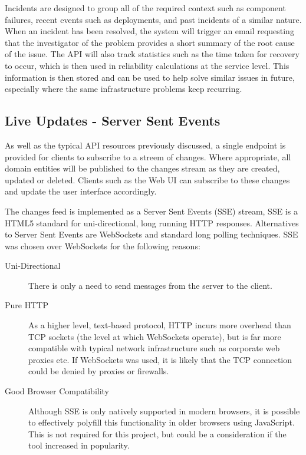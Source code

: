 \documentclass{cshonours}
\begin{document}
Incidents are designed to group all of the required context such as component failures, recent events such as deployments, and past incidents of a similar nature. When an incident has been resolved, the system will trigger an email requesting that the investigator of the problem provides a short summary of the root cause of the issue. The API will also track statistics such as the time taken for recovery to occur, which is then used in reliability calculations at the service level. This information is then stored and can be used to help solve similar issues in future, especially where the same infrastructure problems keep recurring.

\subsection{Live Updates - Server Sent Events}

As well as the typical API resources previously discussed, a single endpoint is provided for clients to subscribe to a streem of changes. Where appropriate, all domain entities will be published to the changes stream as they are created, updated or deleted. Clients such as the Web UI can subscribe to these changes and update the user interface accordingly.

The changes feed is implemented as a Server Sent Events (SSE) stream, SSE is a HTML5 standard for uni-directional, long running HTTP responses. Alternatives to Server Sent Events are WebSockets and standard long polling techniques. SSE was chosen over WebSockets for the following reasons:

\begin{description}
  \item[Uni-Directional] There is only a need to send messages from the server to the client.
  \item[Pure HTTP] As a higher level, text-based protocol, HTTP incurs more overhead than TCP sockets (the level at which WebSockets operate), but is far more compatible with typical network infrastructure such as corporate web proxies etc. If WebSockets was used, it is likely that the TCP connection could be denied by proxies or firewalls.
  \item[Good Browser Compatibility] Although SSE is only natively supported in modern browsers, it is possible to effectively polyfill this functionality in older browsers using JavaScript. This is not required for this project, but could be a consideration if the tool increased in popularity.
\end{description}
\end{document}
